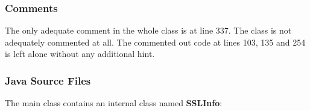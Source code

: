 \subsubsection{Comments}
\begin{itemize}
		The only adequate comment in the whole class is at line 337.
		The class is not adequately commented at all.
		The commented out code at lines 103, 135 and 254 is left alone without any additional hint.
\end{itemize}

\subsubsection{Java Source Files}
\begin{itemize}
		The main class contains an internal class named \textbf{SSLInfo}:
\end{itemize}


